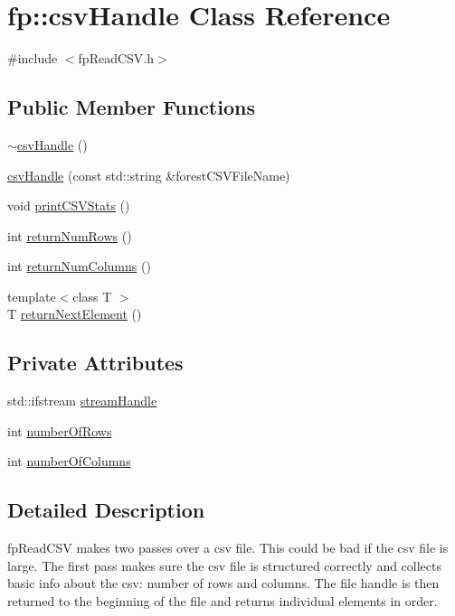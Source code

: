\hypertarget{classfp_1_1csvHandle}{}\section{fp\+:\+:csv\+Handle Class Reference}
\label{classfp_1_1csvHandle}


{\ttfamily \#include $<$fp\+Read\+C\+S\+V.\+h$>$}

\subsection*{Public Member Functions}
\begin{DoxyCompactItemize}
\item 
\hyperlink{classfp_1_1csvHandle_a722156950bc78ce1dbf34626d292acdb}{$\sim$csv\+Handle} ()
\item 
\hyperlink{classfp_1_1csvHandle_a2fa98814fc2300998a0df908e4e520d3}{csv\+Handle} (const std\+::string \&forest\+C\+S\+V\+File\+Name)
\item 
void \hyperlink{classfp_1_1csvHandle_a92b24e693a4add05786e266c9b5cbc62}{print\+C\+S\+V\+Stats} ()
\item 
int \hyperlink{classfp_1_1csvHandle_a580d222d5aa55e716860f514ce661237}{return\+Num\+Rows} ()
\item 
int \hyperlink{classfp_1_1csvHandle_a75e82e4e5b32941fc0a0a777f6ab6adf}{return\+Num\+Columns} ()
\item 
{\footnotesize template$<$class T $>$ }\\T \hyperlink{classfp_1_1csvHandle_a1368fb87fa52c457ef15e1b9903529c4}{return\+Next\+Element} ()
\end{DoxyCompactItemize}
\subsection*{Private Attributes}
\begin{DoxyCompactItemize}
\item 
std\+::ifstream \hyperlink{classfp_1_1csvHandle_a42c4ad8f38a95c724dfa2b173991a524}{stream\+Handle}
\item 
int \hyperlink{classfp_1_1csvHandle_a07cf6b14355c5fa81643a7bb6e9c681f}{number\+Of\+Rows}
\item 
int \hyperlink{classfp_1_1csvHandle_ae3e5280846df348d0b1b86b78f2e3682}{number\+Of\+Columns}
\end{DoxyCompactItemize}


\subsection{Detailed Description}
fp\+Read\+C\+SV makes two passes over a csv file. This could be bad if the csv file is large. The first pass makes sure the csv file is structured correctly and collects basic info about the csv\+: number of rows and columns. The file handle is then returned to the beginning of the file and returns individual elements in order. 

